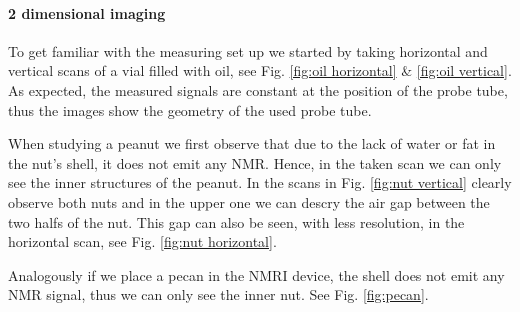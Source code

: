 \paragraph{2 dimensional imaging}
To get familiar with the measuring set up we started by taking horizontal and vertical scans of a vial filled with oil, see Fig. \ref{fig:oil horizontal} \& \ref{fig:oil vertical}. As expected, the measured signals are constant at the position of the probe tube, thus the images show the geometry of the used probe tube. 

When studying a peanut we first observe that due to the lack of water or fat in the nut's shell, it does not emit any NMR. Hence, in the taken scan we can only see the inner structures of the peanut. In the scans in Fig. \ref{fig:nut vertical} clearly observe both nuts and in the upper one we can descry the air gap between the two halfs of the nut. This gap can also be seen, with less resolution, in the horizontal scan, see Fig. \ref{fig:nut horizontal}.

Analogously if we place a pecan in the NMRI device, the shell does not emit any NMR signal, thus we can only see the inner nut. See Fig. \ref{fig:pecan}. 

